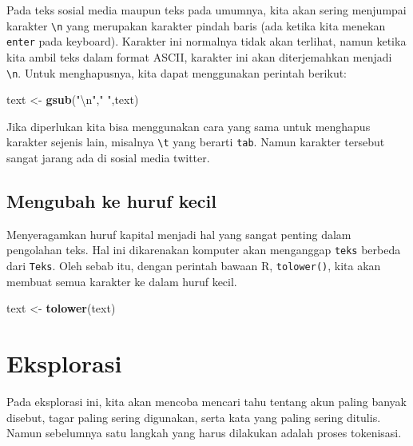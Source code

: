 \documentclass[]{book}
\newenvironment{Shaded}{\begin{snugshade}}{\end{snugshade}}
\newcommand{\CharTok}[1]{\textcolor[rgb]{0.31,0.60,0.02}{#1}}
\newcommand{\KeywordTok}[1]{\textcolor[rgb]{0.13,0.29,0.53}{\textbf{#1}}}
\newcommand{\NormalTok}[1]{#1}
\newcommand{\StringTok}[1]{\textcolor[rgb]{0.31,0.60,0.02}{#1}}
\begin{document}
Pada teks sosial media maupun teks pada umumnya, kita akan sering
menjumpai karakter \texttt{\textbackslash{}n} yang merupakan karakter
pindah baris (ada ketika kita menekan \texttt{enter} pada keyboard).
Karakter ini normalnya tidak akan terlihat, namun ketika kita ambil teks
dalam format ASCII, karakter ini akan diterjemahkan menjadi
\texttt{\textbackslash{}n}. Untuk menghapusnya, kita dapat menggunakan
perintah berikut:

\begin{Shaded}
\begin{Highlighting}[]
\NormalTok{text <-}\StringTok{ }\KeywordTok{gsub}\NormalTok{(}\StringTok{"}\CharTok{\textbackslash{}n}\StringTok{"}\NormalTok{,}\StringTok{" "}\NormalTok{,text)}
\end{Highlighting}
\end{Shaded}

Jika diperlukan kita bisa menggunakan cara yang sama untuk menghapus
karakter sejenis lain, misalnya \texttt{\textbackslash{}t} yang berarti
\texttt{tab}. Namun karakter tersebut sangat jarang ada di sosial media
twitter.

\hypertarget{mengubah-ke-huruf-kecil}{%
\subsection{Mengubah ke huruf kecil}\label{mengubah-ke-huruf-kecil}}

Menyeragamkan huruf kapital menjadi hal yang sangat penting dalam
pengolahan teks. Hal ini dikarenakan komputer akan menganggap
\texttt{teks} berbeda dari \texttt{Teks}. Oleh sebab itu, dengan
perintah bawaan R, \texttt{tolower()}, kita akan membuat semua karakter
ke dalam huruf kecil.

\begin{Shaded}
\begin{Highlighting}[]
\NormalTok{text <-}\StringTok{ }\KeywordTok{tolower}\NormalTok{(text)}
\end{Highlighting}
\end{Shaded}

\hypertarget{explorasi1}{%
\section{Eksplorasi}\label{explorasi1}}

Pada eksplorasi ini, kita akan mencoba mencari tahu tentang akun paling
banyak disebut, tagar paling sering digunakan, serta kata yang paling
sering ditulis. Namun sebelumnya satu langkah yang harus dilakukan
adalah proses tokenisasi.
\end{document}

